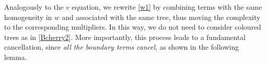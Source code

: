 \documentclass[%
11pt,  reqno]{amsart}
\makeatletter
\newcommand{\5}{\textup{V}}
\newcommand{\noi}{\noindent}
\newcommand{\ind}{\mathbbm 1}
\theoremstyle{remark}
\newcommand{\TT}{\mathcal{T}}
\newcommand{\G}{\Gamma}
\DeclareMathOperator{\mulB}{mul_{\BB}}
\def\<#1>{\csname MH@symb@#1\endcsname}
\def\distC{15}
\newcommand{\cherry}[3]{
	\begin{tikzpicture}[
		baseline=-8, scale=0.6, every node/.style={dotA},
		level distance=15pt,
		level 1/.style={sibling distance=\distC pt}
		]
		\node  [label=above:{$#1$}]  (root) {}
		child
		child
		;
		\node [label= left:{$#2$}]  at (root-1) {};
		\node [label= right:{$#3$}] at (root-2) {};
	\end{tikzpicture}
}
\newcommand{\B}{\mathcal{B}}
\numberwithin{equation}{section}
\numberwithin{theorem}{section}
\newcommand{\BB}{\mathrm{B}}
\newcommand{\D}{\mathrm{D}}
\makeatother
\begin{document}
\noi Analogously to the $v$ equation, we rewrite \eqref{w1} by combining terms with the same homogeneity in $w$ and associated with the same tree, thus moving the complexity to the corresponding multipliers. In this way, we do not need to consider coloured trees as in \eqref{Bcherry2}. More importantly, this process leads to a fundamental cancellation, since \textit{all the boundary terms cancel}, as shown in the following lemma.



\end{document}
